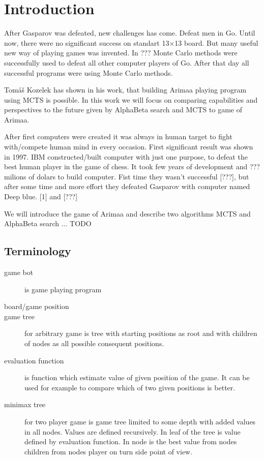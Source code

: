 
\chapter{Introduction}
After Gasparov was defeated, new challenges has come. Defeat men in Go. Until
now, there were no significant success on standart 13$\times$13 board. But many
useful new way of playing games was invented. In ??? Monte Carlo methods were
successfully used to defeat all other computer players of Go. After that day
all successful programs were using Monte Carlo methods.

Tomáš Kozelek has shown in his work, that building Arimaa playing program using
MCTS is possible. In this work we will focus on comparing capabilities and
perspectives to the future given by AlphaBeta search and MCTS to game of
Arimaa.

After first computers were created it was always in human target to fight
with/compete human mind in every occasion. First significant result was shown
in 1997. IBM constructed/built computer with just one purpose, to defeat
the best human player in the game of chess. It took few years of development
and ??? milions of dolars to build computer. Fist time they wasn't successful
[???], but after some time and more effort they defeated Gasparov with computer
named Deep blue.
[1] and [???]

We will introduce the game of Arimaa and describe two algorithms \ac{MCTS} and AlphaBeta search ... TODO


\section{Terminology}
\begin{description}
\item[game bot] is game playing program
\item[board/game position]
\item[game tree] for arbitrary game is tree with starting positions as root and
   with children of nodes as all possible consequent positions.
\item[evaluation function] is function which estimate value of given position of the game. It can be used for example to compare which of two given positions is better.
\item[minimax tree] for two player game is game tree limited to some depth with
added values in all nodes. Values are defined recursively. In leaf of the tree
is value defined by evaluation function. In node is the best value from nodes
children from nodes player on turn side point of view.
\end{description}

